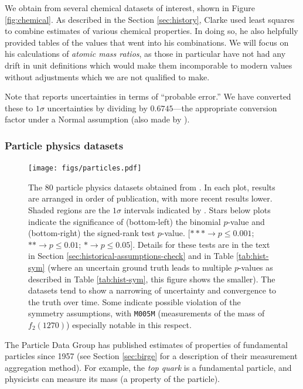 \documentclass[letterpaper,12pt]{article}
\begin{document}
We obtain from \citet{clarke1910recalculation} several chemical datasets of interest, shown in Figure \ref{fig:chemical}. As described in the Section \ref{sec:history}, Clarke used least squares to combine estimates of various chemical properties. In doing so, he also helpfully provided tables of the values that went into his combinations. We will focus on his calculations of \textit{atomic mass ratios}, as those in particular have not had any drift in unit definitions which would make them incomporable to modern values without adjustments which we are not qualified to make.

Note that \citet{clarke1910recalculation} reports uncertainties in terms of ``probable error.'' We have converted these to $1\sigma$ uncertainties by dividing by $0.6745$---the appropriate conversion factor under a Normal assumption (also made by \citet{clarke1910recalculation}).

\subsubsection{Particle physics datasets}\label{sec:pdg1970}

\begin{figure}[htbp]
  \texttt{[image: figs/particles.pdf]}
  \caption{The 80 particle physics datasets obtained from \citet{roos1970review}. In each plot, results are arranged in order of publication, with more recent results lower. Shaded regions are the $1\sigma$ intervals indicated by \citet{navas2024review}. Stars below plots indicate the significance of (bottom-left) the binomial $p$-value and (bottom-right) the signed-rank test $p$-value. [$\ast\ast\ast\rightarrow p\leq 0.001$; $\ast\ast\rightarrow p\leq 0.01$; $\ast\rightarrow p\leq0.05$]. Details for these tests are in the text in Section \ref{sec:historical-assumptions-check} and in Table \ref{tab:hist-sym} (where an uncertain ground truth leads to multiple $p$-values as described in Table \ref{tab:hist-sym}, this figure shows the smaller). The datasets tend to show a narrowing of uncertainty and convergence to the truth over time. Some indicate possible violation of the symmetry assumptions, with \texttt{M005M} (measurements of the mass of $f_2(1270)$) especially notable in this respect.}
  \label{fig:particle}
\end{figure}

The Particle Data Group has published estimates of properties of fundamental particles since 1957 (see Section \ref{sec:birge} for a description of their measurement aggregation method). For example, the \emph{top quark} is a fundamental particle, and physicists can measure its mass (a property of the particle).
\end{document}
